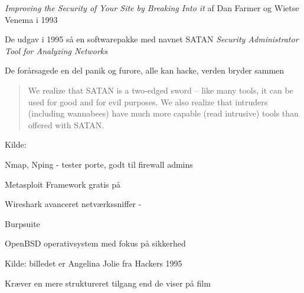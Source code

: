 \documentclass[20pt,landscape,a4paper,footrule]{foils}
\begin{document}
\begin{list1}
\item \emph{Improving the Security of Your Site by Breaking Into it} af
Dan Farmer og Wietse Venema i 1993
\item De udgav i 1995 så en softwarepakke med navnet SATAN
\emph{Security Administrator Tool for Analyzing Networks}
\item De forårsagede en del panik og furore, alle kan hacke, verden bryder sammen

\vskip 1cm
\begin{quote}
We realize that SATAN is a two-edged sword -- like
many tools, it can be used for good and for evil
purposes. We also realize that intruders (including
wannabees) have much more capable (read intrusive)
tools than offered with SATAN.
\end{quote}
\end{list1}

\vskip 1cm
Kilde:




\begin{list2}
\item Nmap, Nping - tester porte, godt til firewall admins 
\item Metasploit Framework gratis på 
\item Wireshark avanceret netværkssniffer - 
\item Burpsuite 
\item OpenBSD operativsystem med fokus
  på sikkerhed  
\end{list2}

Kilde: billedet er Angelina Jolie fra Hackers 1995

\centerline{Kræver en mere struktureret tilgang end de viser på film \smiley}






\end{document}
